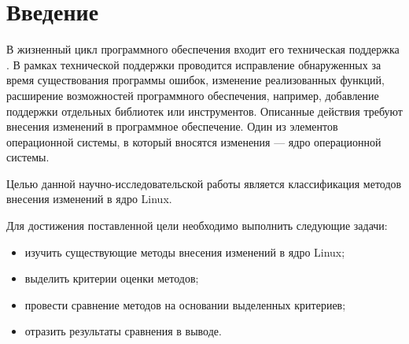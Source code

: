 \chapter*{Введение}

В жизненный цикл программного обеспечения входит его техническая поддержка \cite{life-cycle}. В рамках технической поддержки проводится  исправление обнаруженных за время существования программы ошибок, изменение реализованных функций, расширение возможностей программного обеспечения, например, добавление поддержки отдельных библиотек или инструментов. Описанные действия требуют внесения изменений в программное обеспечение. Один из элементов операционной системы, в который вносятся изменения --- ядро операционной системы.

Целью данной научно-исследовательской работы является классификация методов внесения изменений в ядро Linux.

Для достижения поставленной цели необходимо выполнить следующие задачи:

\begin{itemize}
	\item изучить существующие методы внесения изменений в ядро Linux;
	\item выделить критерии оценки методов;
	\item провести сравнение методов на основании выделенных критериев;
	\item отразить результаты сравнения в выводе.
\end{itemize}